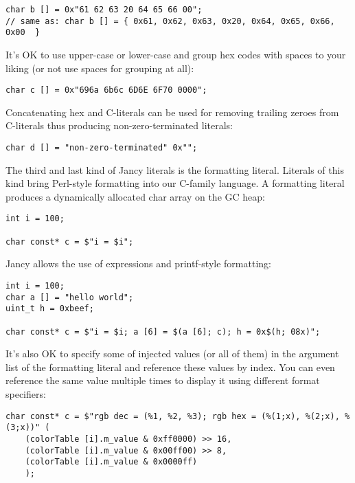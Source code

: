 \documentclass[oneside]{book}
\begin{document}
\begin{lstlisting}
char b [] = 0x"61 62 63 20 64 65 66 00";  
// same as: char b [] = { 0x61, 0x62, 0x63, 0x20, 0x64, 0x65, 0x66, 0x00  }
\end{lstlisting}

It's OK to use upper-case or lower-case and group hex codes with spaces to your liking (or not use spaces for grouping at all):

\begin{lstlisting}
char c [] = 0x"696a 6b6c 6D6E 6F70 0000";
\end{lstlisting}

Concatenating hex and C-literals can be used for removing trailing zeroes from C-literals thus producing non-zero-terminated literals:

\begin{lstlisting}
char d [] = "non-zero-terminated" 0x"";
\end{lstlisting}

The third and last kind of Jancy literals is the formatting literal. Literals of this kind bring Perl-style formatting into our C-family language. A formatting literal produces a dynamically allocated char array on the GC heap:

\begin{lstlisting}
int i = 100;    

char const* c = $"i = $i";
\end{lstlisting}

Jancy allows the use of expressions and printf-style formatting:

\begin{lstlisting}
int i = 100;    
char a [] = "hello world";
uint_t h = 0xbeef;

char const* c = $"i = $i; a [6] = $(a [6]; c); h = 0x$(h; 08x)";
\end{lstlisting}

It's also OK to specify some of injected values (or all of them) in the argument list of the formatting literal and reference these values by index. You can even reference the same value multiple times to display it using different format specifiers:

\begin{lstlisting}
char const* c = $"rgb dec = (%1, %2, %3); rgb hex = (%(1;x), %(2;x), %(3;x))" (
    (colorTable [i].m_value & 0xff0000) >> 16,
    (colorTable [i].m_value & 0x00ff00) >> 8,
    (colorTable [i].m_value & 0x0000ff)
    );
\end{lstlisting}
\end{document}
